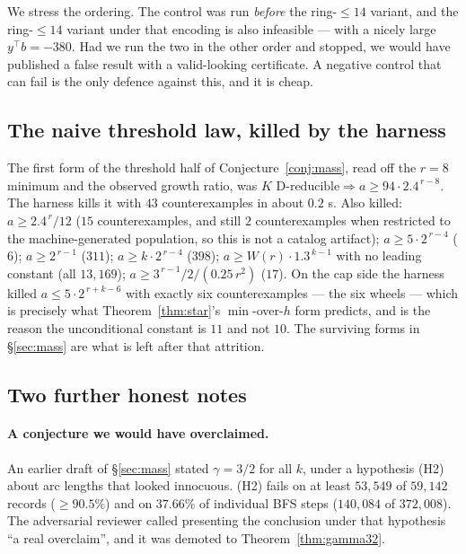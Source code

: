 \documentclass[11pt]{article}
\theoremstyle{definition}
\begin{document}
We stress the ordering. The control was run \emph{before} the ring-$\le 14$ variant,
and the ring-$\le14$ variant under that encoding is also infeasible --- with a nicely
large $y^\top b = -380$. Had we run the two in the other order and stopped, we would
have published a false result with a valid-looking certificate. A negative control
that can fail is the only defence against this, and it is cheap.

\subsection{The naive threshold law, killed by the harness}

The first form of the threshold half of Conjecture~\ref{conj:mass}, read off the
$r=8$ minimum and the observed growth ratio, was
$K \text{ D-reducible} \Rightarrow a \ge 94 \cdot 2.4^{\,r-8}$. The harness kills it
with $43$ counterexamples in about $0.2$ s. Also killed: $a \ge 2.4^{\,r}/12$
($15$ counterexamples, and still $2$ counterexamples when restricted to the
machine-generated population, so this is not a catalog artifact);
$a \ge 5\cdot2^{\,r-4}$ ($6$); $a \ge 2^{\,r-1}$ ($311$); $a \ge k\cdot 2^{\,r-4}$
($398$); $a \ge W(r)\cdot 1.3^{\,k-1}$ with no leading constant (all $13{,}169$);
$a \ge 3^{\,r-1}/2/(0.25\,r^2)$ ($17$). On the cap side the harness killed
$a \le 5\cdot2^{\,r+k-6}$ with exactly six counterexamples --- the six wheels --- which
is precisely what Theorem~\ref{thm:star}'s $\min$-over-$h$ form predicts, and is the
reason the unconditional constant is $11$ and not $10$. The surviving forms in
\S\ref{sec:mass} are what is left after that attrition.

\subsection{Two further honest notes}

\paragraph{A conjecture we would have overclaimed.} An earlier draft of
\S\ref{sec:mass} stated $\gamma=3/2$ for all $k$, under a hypothesis (H2) about arc
lengths that looked innocuous. (H2) fails on at least $53{,}549$ of $59{,}142$
records ($\ge 90.5\%$) and on $37.66\%$ of individual BFS steps ($140{,}084$ of
$372{,}008$). The adversarial reviewer called
presenting the conclusion under that hypothesis ``a real overclaim'', and it was
demoted to Theorem~\ref{thm:gamma32}.
\end{document}
